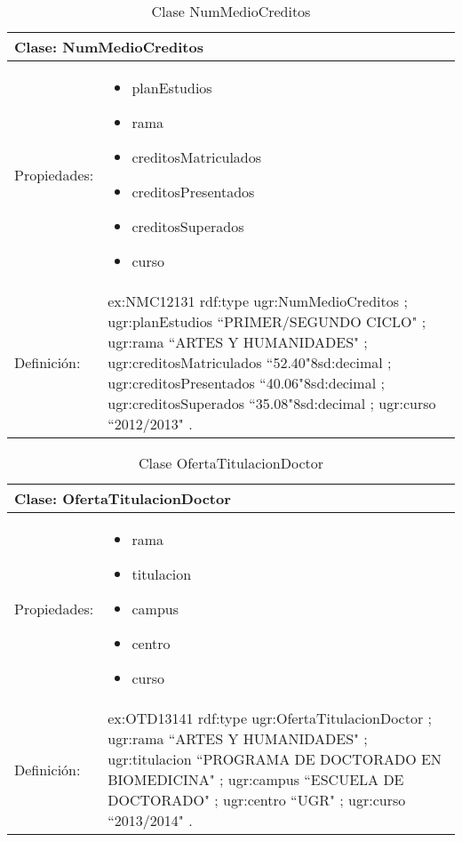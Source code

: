 \begin{table}[!ht]
	\centering
	\begin{tabular}{|p{}|p{}|}
		\hline
		\multicolumn{2}{|l|}{Clase: \textbf{NumMedioCreditos}}
		\\ \hline
		Propiedades:&
		\begin{itemize}
			\item planEstudios
			\item rama
			\item creditosMatriculados
			\item creditosPresentados
			\item creditosSuperados
			\item curso
		\end{itemize}
		\\ \hline
		Definición:&
		ex:NMC12131 rdf:type ugr:NumMedioCreditos ;\newline
		\tab ugr:planEstudios ``PRIMER/SEGUNDO CICLO" ;\newline
		\tab ugr:rama ``ARTES Y HUMANIDADES" ;\newline
		\tab ugr:creditosMatriculados ``52.40"^^xsd:decimal ;\newline
		\tab ugr:creditosPresentados ``40.06"^^xsd:decimal ;\newline
		\tab ugr:creditosSuperados ``35.08"^^xsd:decimal ;\newline
		\tab ugr:curso ``2012/2013" .
		\\ \hline
	\end{tabular}
	\caption{Clase NumMedioCreditos}
	\label{clase-nummediocreditos}
\end{table}

\begin{table}[!ht]
	\centering
	\begin{tabular}{|p{}|p{}|}
		\hline
		\multicolumn{2}{|l|}{Clase: \textbf{OfertaTitulacionDoctor}}
		\\ \hline
		Propiedades:&
		\begin{itemize}
			\item rama
			\item titulacion
			\item campus
			\item centro
			\item curso
		\end{itemize}
		\\ \hline
		Definición:&
		ex:OTD13141 rdf:type ugr:OfertaTitulacionDoctor ;\newline
		\tab ugr:rama ``ARTES Y HUMANIDADES" ;\newline
		\tab ugr:titulacion ``PROGRAMA DE DOCTORADO EN BIOMEDICINA" ;\newline
		\tab ugr:campus ``ESCUELA DE DOCTORADO" ;\newline
		\tab ugr:centro ``UGR" ;\newline
		\tab ugr:curso ``2013/2014" .
		\\ \hline
	\end{tabular}
	\caption{Clase OfertaTitulacionDoctor}
	\label{clase-ofertatitulaciondoctor}
\end{table}

